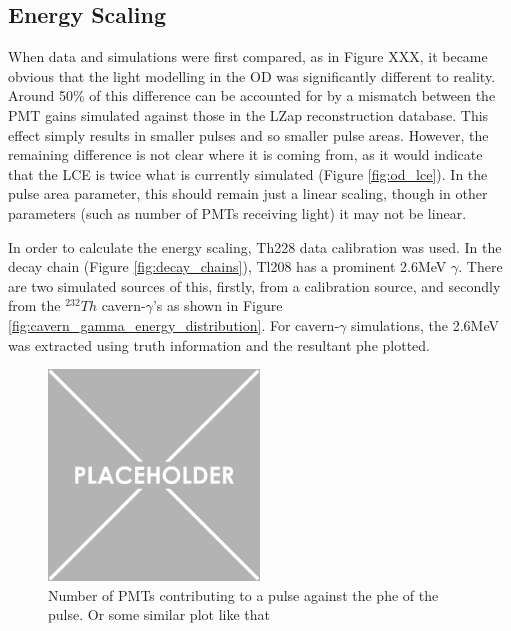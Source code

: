 \subsection{Energy Scaling}
\par
When data and simulations were first compared, as in Figure XXX, it became obvious that the light modelling in the OD was significantly different to reality.
Around 50\% of this difference can be accounted for by a mismatch between the PMT gains simulated against those in the LZap reconstruction database.
This effect simply results in smaller pulses and so smaller pulse areas.
However, the remaining difference is not clear where it is coming from, as it would indicate that the LCE is twice what is currently simulated (Figure \ref{fig:od_lce}).
In the pulse area parameter, this should remain just a linear scaling, though in other parameters (such as number of PMTs receiving light) it may not be linear.

\par
In order to calculate the energy scaling, Th228 data calibration was used. 
In the decay chain (Figure \ref{fig:decay_chains}), Tl208 has a prominent 2.6MeV $\gamma$. 
There are two simulated sources of this, firstly, from a calibration source, and secondly from the ${}^{232}Th$ cavern-$\gamma$'s as shown in Figure \ref{fig:cavern_gamma_energy_distribution}.
For cavern-$\gamma$ simulations, the 2.6MeV was extracted using truth information and the resultant phe plotted.


\begin{figure}
    \centering
    \includegraphics[width=0.5\textwidth]{Figures/Placeholder.png}
    \caption{Number of PMTs contributing to a pulse against the phe of the pulse. Or some similar plot like that}
    \label{fig:OD_coincidence_difference}
\end{figure}


